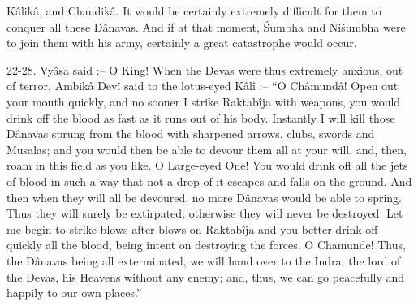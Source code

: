 K\^alik\^a, and Chandik\^a. It would be certainly extremely difficult for them to conquer all these D\^anavas. And if at that moment, \'Sumbha and Ni\'sumbha were to join them with his army, certainly a great catastrophe would occur.

22-28. Vy\^asa said :-- O King! When the Devas were thus extremely anxious, out of terror, Ambik\^a Dev\^i said to the lotus-eyed K\^al\^i :-- ``O Ch\^amund\^a! Open out your mouth quickly, and no sooner I strike Raktab\^ija with weapons, you would drink off the blood as fast as it runs out of his body. Instantly I will kill those D\^anavas sprung from the blood with sharpened arrows, clubs, swords and Musalas; and you would then be able to devour them all at your will, and, then, roam in this field as you like. O Large-eyed One! You would drink off all the jets of blood in such a way that not a drop of it escapes and falls on the ground. And then when they will all be devoured, no more D\^anavas would be able to spring. Thus they will surely be extirpated; otherwise they will never be destroyed. Let me begin to strike blows after blows on Raktab\^ija and you better drink off quickly all the blood, being intent on destroying the forces. O Chamunde! Thus, the D\^anavas being all exterminated, we will hand over to the Indra, the lord of the Devas, his Heavens without any enemy; and, thus, we can go peacefully and happily to our own places.''

